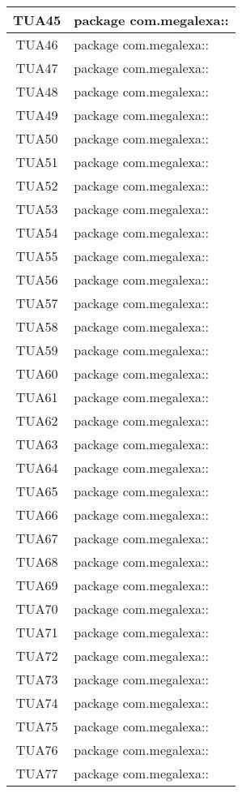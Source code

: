 \begin{longtable}{|c|m{28em}|}
	TUA45 & package com.megalexa::\\ \hline
	TUA46 & package com.megalexa::\\ \hline
	TUA47 & package com.megalexa::\\ \hline
	TUA48 & package com.megalexa::\\ \hline
	TUA49 & package com.megalexa::\\ \hline
	TUA50 & package com.megalexa::\\ \hline
	TUA51 & package com.megalexa::\\ \hline
	TUA52 & package com.megalexa::\\ \hline
	TUA53 & package com.megalexa::\\ \hline
	TUA54 & package com.megalexa::\\ \hline
	TUA55 & package com.megalexa::\\ \hline
	TUA56 & package com.megalexa::\\ \hline
	TUA57 & package com.megalexa::\\ \hline
	TUA58 & package com.megalexa::\\ \hline
	TUA59 & package com.megalexa::\\ \hline
	TUA60 & package com.megalexa::\\ \hline
	TUA61 & package com.megalexa::\\ \hline
	TUA62 & package com.megalexa::\\ \hline
	TUA63 & package com.megalexa::\\ \hline
	TUA64 & package com.megalexa::\\ \hline
	TUA65 & package com.megalexa::\\ \hline
	TUA66 & package com.megalexa::\\ \hline
	TUA67 & package com.megalexa::\\ \hline
	TUA68 & package com.megalexa::\\ \hline
	TUA69 & package com.megalexa::\\ \hline
	TUA70 & package com.megalexa::\\ \hline
	TUA71 & package com.megalexa::\\ \hline
	TUA72 & package com.megalexa::\\ \hline
	TUA73 & package com.megalexa::\\ \hline
	TUA74 & package com.megalexa::\\ \hline
	TUA75 & package com.megalexa::\\ \hline
	TUA76 & package com.megalexa::\\ \hline
	TUA77 & package com.megalexa::\\ \hline

\end{longtable}
